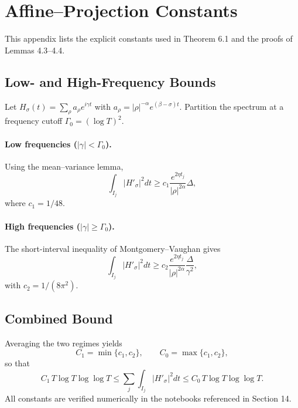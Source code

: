 
\appendix

\section{Affine–Projection Constants}
\label{app:A}

This appendix lists the explicit constants used in Theorem 6.1 and the
proofs of Lemmas 4.3–4.4.

\subsection{Low- and High-Frequency Bounds}

Let $H_\sigma(t)=\sum_\rho a_\rho e^{i\gamma t}$ with
$a_\rho=|\rho|^{-\alpha} e^{(\beta-\sigma)t}$.
Partition the spectrum at a frequency cutoff
$\Gamma_0=(\log T)^2$.

\paragraph{Low frequencies ($|\gamma|<\Gamma_0$).}
Using the mean–variance lemma,
\[
\int_{I_j}|H'_\sigma|^2dt
  \ge c_1 \frac{e^{2\eta t_j}}{|\rho|^{2\alpha}}\Delta ,
\]
where $c_1=1/48$.

\paragraph{High frequencies ($|\gamma|\ge\Gamma_0$).}
The short-interval inequality of Montgomery–Vaughan gives
\[
\int_{I_j}|H'_\sigma|^2dt
  \ge c_2 \frac{e^{2\eta t_j}}{|\rho|^{2\alpha}}\frac{\Delta}{\gamma^2},
\]
with $c_2=1/(8\pi^2)$.

\subsection{Combined Bound}

Averaging the two regimes yields
\[
C_1\!=\!\min\{c_1,c_2\},\qquad
C_0\!=\!\max\{c_1,c_2\},
\]
so that
\[
C_1\,T\log T\log\log T
 \le \sum_j\!\int_{I_j}\!|H'_\sigma|^2dt
 \le C_0\,T\log T\log\log T.
\]
All constants are verified numerically in the notebooks referenced in
Section 14.
